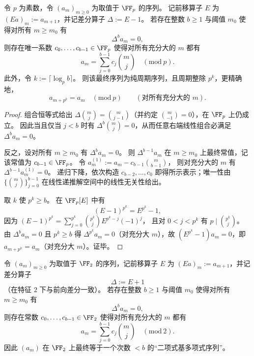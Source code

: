 \begin{theorem}[模 \(p\) 的幂零差分与二项式基规范形]\label{thm:pom-modp-difference-binomial-basis}
令 \(p\) 为素数，令 \((a_m)_{m\ge 0}\) 为取值于 \(\FF_p\) 的序列。
记前移算子 \(E\) 为 \((Ea)_m:=a_{m+1}\)，并记差分算子 \(\Delta:=E-1\)。
若存在整数 \(b\ge 1\) 与阈值 \(m_0\) 使得对所有 \(m\ge m_0\) 有
\[
\Delta^b a_m=0,
\]
则存在唯一系数 \(c_0,\dots,c_{b-1}\in\FF_p\) 使得对所有充分大的 \(m\) 都有
\[
a_m=\sum_{j=0}^{b-1} c_j\binom{m}{j}\quad(\mathrm{mod}\ p).
\]
此外，令 \(k:=\lceil\log_p b\rceil\)。
则该最终序列为纯周期序列，且周期整除 \(p^k\)，更精确地，
\[
a_{m+p^k}=a_m\quad(\mathrm{mod}\ p)
\qquad
(\text{对所有充分大的 }m).
\]
\end{theorem}
\begin{proof}
组合恒等式给出 \(\Delta\binom{m}{j}=\binom{m}{j-1}\)（并约定 \(\binom{m}{-1}=0\)），在 \(\FF_p\) 上仍成立。
因此当且仅当 \(j<b\) 时有 \(\Delta^b\binom{m}{j}=0\)，从而任意右端线性组合必满足 \(\Delta^b a_m=0\)。
\par
反之，设对所有 \(m\ge m_0\) 有 \(\Delta^b a_m=0\)。
则 \(\Delta^{b-1}a_m\) 在 \(m\ge m_0\) 上最终常值，记该常值为 \(c_{b-1}\in\FF_p\)。
令
\(
a^{(1)}_m:=a_m-c_{b-1}\binom{m}{b-1}
\)，
则对充分大的 \(m\) 有 \(\Delta^{b-1}a^{(1)}_m=0\)。
递归下降，依次构造 \(c_{b-2},\dots,c_0\) 即得所示表示；唯一性由 \(\{\binom{m}{j}\}_{j=0}^{b-1}\) 在线性递推解空间中的线性无关性给出。
\par
取 \(k\) 使 \(p^k\ge b\)。
在 \(\FF_p[E]\) 中有
\[
(E-1)^{p^k}=E^{p^k}-1,
\]
因为
\((E-1)^{p^k}=\sum_{j=0}^{p^k}\binom{p^k}{j}E^{p^k-j}(-1)^j\)，
且对 \(0<j<p^k\) 有 \(p\mid \binom{p^k}{j}\)。
由 \(\Delta^b a_m=0\) 且 \(p^k\ge b\) 得 \(\Delta^{p^k}a_m=0\)（对充分大 \(m\)），故 \((E^{p^k}-1)a_m=0\)，即 \(a_{m+p^k}=a_m\)（对充分大 \(m\)）。证毕。
\end{proof}

\begin{theorem}[模 \(2\) 塌缩特征多项式强制的高阶差分多项式性]\label{thm:pom-mod2-difference-binomial-basis}
令 \((a_m)_{m\ge 0}\) 为取值于 \(\FF_2\) 的序列，记前移算子 \(E\) 为 \((Ea)_m:=a_{m+1}\)，并记差分算子
\[
\Delta:=E+1
\]
（在特征 \(2\) 下与前向差分一致）。
若存在整数 \(b\ge 1\) 与阈值 \(m_0\) 使得对所有 \(m\ge m_0\) 有
\[
\Delta^b a_m=0,
\]
则存在常数 \(c_0,\dots,c_{b-1}\in\FF_2\) 使得对所有充分大的 \(m\) 都有
\[
a_m=\sum_{j=0}^{b-1} c_j\binom{m}{j}\quad(\mathrm{mod}\ 2).
\]
因此 \((a_m)\) 在 \(\FF_2\) 上最终等于一个次数 \(<b\) 的“二项式基多项式序列”。
\end{theorem}

